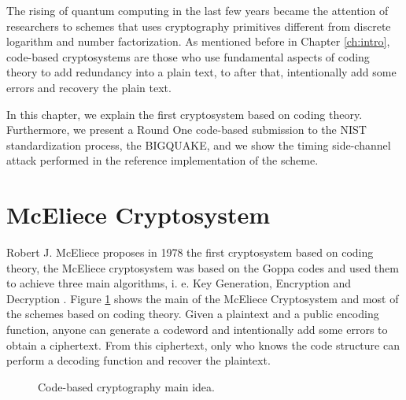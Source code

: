 The rising of quantum computing in the last few years became the attention of researchers to schemes that uses cryptography primitives different from discrete logarithm and number factorization. As mentioned before in Chapter \ref{ch:intro}, code-based cryptosystems are those who use fundamental aspects of coding theory to add redundancy into a plain text, to after that, intentionally add some errors and recovery the plain text. 

In this chapter, we explain the first cryptosystem based on coding theory. Furthermore, we present a Round One code-based submission to the NIST standardization process, the BIGQUAKE, and we show the timing side-channel attack performed in the reference implementation of the scheme.

\section{McEliece Cryptosystem}
Robert J. McEliece proposes in 1978 the first cryptosystem based on coding theory, the McEliece cryptosystem was based on the Goppa codes and used them to achieve three main algorithms, i. e. Key Generation, Encryption and Decryption \cite{mceliece1978public}. Figure \ref{fig:code-idea} shows the main of the McEliece Cryptosystem and most of the schemes based on coding theory. Given a plaintext and a public encoding function, anyone can generate a codeword and intentionally add some errors to obtain a ciphertext. From this ciphertext, only who knows the code structure can perform a decoding function and recover the plaintext.


\begin{figure}
    \centering
    \label{fig:code-idea}
    \caption{Code-based cryptography main idea.}
\end{figure}

